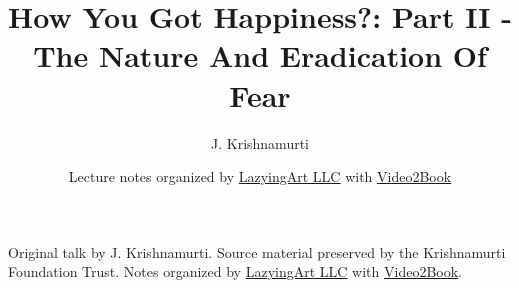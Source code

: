 \documentclass[11pt,oneside]{book}
\begin{document}
\frontmatter
\title{How You Got Happiness?: Part II - The Nature And Eradication Of Fear}
\author{J. Krishnamurti}
\date{Lecture notes organized by \href{https://lazying.art}{LazyingArt LLC} with \href{https://github.com/lachlanchen/Video2Book}{Video2Book}}
\maketitle
\begin{center}
\small Original talk by J. Krishnamurti. Source material preserved by the Krishnamurti Foundation Trust. Notes organized by \href{https://lazying.art}{LazyingArt LLC} with \href{https://github.com/lachlanchen/Video2Book}{Video2Book}.
\end{center}
\clearpage
\mainmatter

\end{document}

